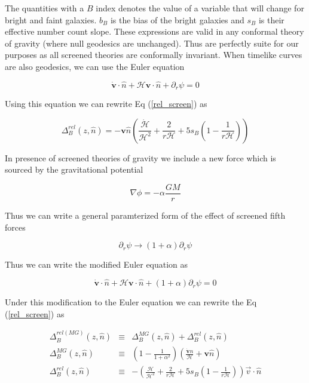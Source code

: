 \documentclass[aps,showpacs,onecolumn,floats,prd,superscriptaddress,nofootinbib]{revtex4-1}
\begin{document}
The quantities with a $B$ index denotes the value of a variable that will change for bright and faint galaxies. 
$b_B$ is the bias of the bright galaxies and $s_B$ is their effective number count slope. 
These expressions are valid in any conformal theory of gravity (where null geodesics are unchanged). 
Thus are perfectly suite for our purposes as all screened theories are conformally invariant. 
When timelike curves are also geodesics, we can use the Euler equation 

\begin{equation}
	\dot{\textbf{v}} \cdot \hat{n} + \mathcal{H} \textbf{v} \cdot \hat{n} + \partial_r \psi = 0 
\end{equation}

Using this equation we can rewrite Eq (\ref{rel_screen}) as 

\begin{equation}
	\Delta^{rel}_B (z,\hat{n}) = - \textbf{v} \hat{n} \left( \frac{\dot{\mathcal{H}}}{\mathcal{H}^2} + \frac{2}{r \mathcal{H}} + 5s_B \left(1 - \frac{1}{r \mathcal{H}} \right) \right)
\end{equation}

In presence of screened theories of gravity we include a new force which is sourced by the gravitational potential

\begin{equation}
	\nabla \phi = -\alpha \frac{GM}{r}
\end{equation}

Thus we can write a general paramterized form of the effect of screened fifth forces

\begin{equation}
	\partial_r \psi \rightarrow (1+\alpha) \partial_r \psi
\end{equation}

Thus we can write the modified Euler equation as 

\begin{equation}
	\dot{\textbf{v}} \cdot \hat{n} + \mathcal{H} \textbf{v} \cdot \hat{n} + (1+\alpha) \partial_r \psi = 0 \label{Euler_screen}
\end{equation}

Under this modification to the Euler equation we can rewrite the Eq (\ref{rel_screen}) as 

\begin{eqnarray}
	\Delta^{rel(MG)}_B(z, \hat{n}) & \equiv & \Delta^{MG}_B(z, \hat{n}) + \Delta^{rel}_B(z, \hat{n}) \nonumber	\\
	\Delta^{MG}_B(z, \hat{n}) & \equiv & \left( 1 - \frac{1}{1 + \alpha^2} \right) \left( \frac{\dot{\textbf{v}} n}{\mathcal{H}} + \mathbf{v} \hat{n} \right) \nonumber \\
	\Delta^{rel}_B(z,\hat{n}) & \equiv & -\left( \frac{\mathcal{H}}{\mathcal{H}^2} + \frac{2}{r\mathcal{H}} + 5 s_B \left( 1 - \frac{1}{r\mathcal{H}} \right) \right) \vec{v} \cdot \hat{n}
\end{eqnarray}
\end{document}

